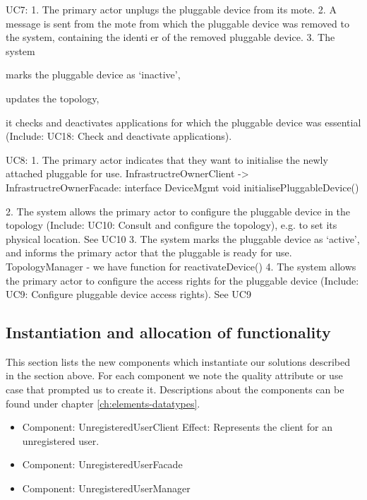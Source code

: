      UC7:
        1. The primary actor unplugs the pluggable device from its mote.
        2. A message is sent from the mote from which the pluggable device was removed to the system,
            containing the identier of the removed pluggable device.
        3. The system
        { marks the pluggable device as `inactive',
        { updates the topology,
        { it checks and deactivates applications for which the pluggable device was essential
        (Include: UC18: Check and deactivate applications).
        
     UC8:
        1. The primary actor indicates that they want to initialise the newly attached pluggable for use.
            InfrastructreOwnerClient -> InfrastructreOwnerFacade: interface DeviceMgmt
                                void initialisePluggableDevice()
                                        
        2. The system allows the primary actor to configure the pluggable device in the topology
            (Include: UC10: Consult and configure the topology), e.g. to set its physical location.
             See UC10
        3. The system marks the pluggable device as `active', and informs the primary actor that the
            pluggable is ready for use.
            TopologyManager - we have function for reactivateDevice()
        4. The system allows the primary actor to configure the access rights for the pluggable device
            (Include: UC9: Configure pluggable device access rights).
            See UC9

\subsection{Instantiation and allocation of functionality}
    This section lists the new components which instantiate our solutions
    described in the section above. For each component we note the quality
    attribute or use case that prompted us to create it. Descriptions about
    the components can be found under chapter \ref{ch:elements-datatypes}. \\

    \begin{itemize}
        \item Component: UnregisteredUserClient
              Effect: Represents the client for an unregistered user.
        \item Component: UnregisteredUserFacade
        \item Component: UnregisteredUserManager
    \end{itemize}


}}}
